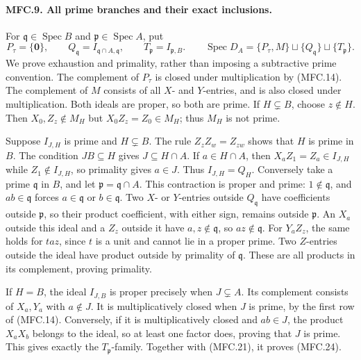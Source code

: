 \paragraph{MFC.9. All prime branches and their exact inclusions.}
For \(\mathfrak q\in\operatorname{Spec}B\) and
\(\mathfrak p\in\operatorname{Spec}A\), put
\[
 P_\tau=\{\mathbf0\},\qquad
 Q_{\mathfrak q}=I_{\mathfrak q\cap A,\mathfrak q},
 \qquad T_{\mathfrak p}=I_{\mathfrak p,B}.
 \qquad
 \operatorname{Spec}D_A=
 \{P_\tau,M\}\sqcup\{Q_{\mathfrak q}\}\sqcup\{T_{\mathfrak p}\}.
                                                               \tag{MFC.24}
\]
We prove exhaustion and primality, rather than imposing a subtractive
prime convention. The complement of \(P_\tau\) is closed under
multiplication by (MFC.14). The complement of \(M\) consists
of all \(X\)- and \(Y\)-entries, and is also closed under
multiplication. Both ideals are proper, so both are prime.
If \(H\subsetneq B\), choose \(z\notin H\).
Then \(X_0,Z_z\notin M_H\) but \(X_0Z_z=Z_0\in M_H\);
thus \(M_H\) is not prime.

Suppose \(I_{J,H}\) is prime and \(H\subsetneq B\).
The rule \(Z_zZ_w=Z_{zw}\) shows that \(H\) is prime in \(B\).
The condition \(JB\subseteq H\) gives \(J\subseteq H\cap A\).
If \(a\in H\cap A\), then \(X_aZ_1=Z_a\in I_{J,H}\)
while \(Z_1\notin I_{J,H}\), so primality gives \(a\in J\).
Thus \(I_{J,H}=Q_H\).
Conversely take a prime \(\mathfrak q\) in \(B\), and let
\(\mathfrak p=\mathfrak q\cap A\). This contraction is proper
and prime: \(1\notin\mathfrak q\), and \(ab\in\mathfrak q\)
forces \(a\in\mathfrak q\) or \(b\in\mathfrak q\).
Two \(X\)- or \(Y\)-entries outside \(Q_{\mathfrak q}\)
have coefficients outside \(\mathfrak p\), so their product
coefficient, with either sign, remains outside \(\mathfrak p\).
An \(X_a\) outside this ideal and a \(Z_z\) outside it have
\(a,z\notin\mathfrak q\), so \(az\notin\mathfrak q\).
For \(Y_aZ_z\), the same holds for \(taz\), since \(t\) is a
unit and cannot lie in a proper prime. Two \(Z\)-entries outside
the ideal have product outside by primality of \(\mathfrak q\).
These are all products in its complement, proving primality.

If \(H=B\), the ideal \(I_{J,B}\) is proper precisely when
\(J\subsetneq A\). Its complement consists of \(X_a,Y_a\)
with \(a\notin J\). It is multiplicatively closed when \(J\)
is prime, by the first row of (MFC.14). Conversely, if it is
multiplicatively closed and \(ab\in J\), the product
\(X_aX_b\) belongs to the ideal, so at least one factor does,
proving that \(J\) is prime. This gives exactly the
\(T_{\mathfrak p}\)-family. Together with (MFC.21), it proves
(MFC.24).

